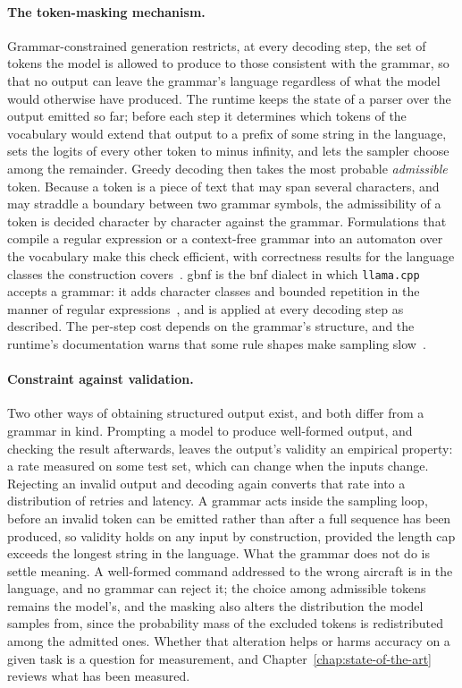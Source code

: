 \paragraph{The token-masking mechanism.} Grammar-constrained generation restricts, at every
decoding step, the set of tokens the model is allowed to produce to those consistent with the
grammar, so that no output can leave the grammar's language regardless of what the model would
otherwise have produced. The runtime keeps the state of a parser over the output emitted so far;
before each step it determines which tokens of the vocabulary would extend that output to a
prefix of some string in the language, sets the logits of every other token to minus infinity,
and lets the sampler choose among the remainder. Greedy decoding then takes the most probable
\emph{admissible} token. Because a token is a piece of text that may span several characters,
and may straddle a boundary between two grammar symbols, the admissibility of a token is decided
character by character against the grammar. Formulations that compile a regular expression or a
context-free grammar into an automaton over the vocabulary make this check efficient, with
correctness results for the language classes the construction covers~\cite{willard2023,koo2024}.
\Gls{gbnf} is the \gls{bnf} dialect in which \texttt{llama.cpp} accepts a grammar: it adds
character classes and bounded repetition in the manner of regular expressions~\cite{llamacpp},
and is applied at every decoding step as described. The per-step cost
depends on the grammar's structure, and the runtime's documentation warns that some rule shapes
make sampling slow~\cite{llamacpp}.

\paragraph{Constraint against validation.} Two other ways of obtaining structured output exist,
and both differ from a grammar in kind. Prompting a model to produce well-formed output, and
checking the result afterwards, leaves the output's validity an empirical property: a rate
measured on some test set, which can change when the inputs change. Rejecting an invalid output
and decoding again converts that rate into a distribution of retries and latency. A grammar acts
inside the sampling loop, before an invalid token can be emitted rather than after a full
sequence has been produced, so validity holds on any input by construction, provided the length
cap exceeds the longest string in the language. What the grammar does not do is settle meaning. A
well-formed command addressed to the wrong aircraft is in the language, and no grammar can reject
it; the choice among admissible tokens remains the model's, and the masking also alters the
distribution the model samples from, since the probability mass of the excluded tokens is
redistributed among the admitted ones. Whether that alteration helps or harms accuracy on a given
task is a question for measurement, and Chapter~\ref{chap:state-of-the-art} reviews what has been
measured.

